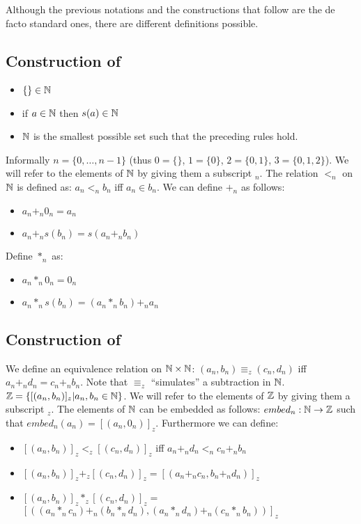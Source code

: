 Although the previous notations and the constructions that follow are
the de facto standard ones, there are different definitions possible.

\subsection{Construction of \N}

\begin{itemize}
  \item $\{\} \in \mathbb N$
  \item if $a \in \mathbb N$ then $s(a) \in \mathbb N$
  \item $\mathbb N$ is the smallest possible set such that the preceding rules
  hold.
\end{itemize}
Informally $n=\{0,\ldots,n-1\}$ (thus $0=\{\}$, $1=\{0\}$, $2=\{0,1\}$,
$3=\{0,1,2\}$). We will refer to the elements of $\mathbb N$ by giving them a
subscript $_n$. The relation $<_n$ on $\mathbb N$ is defined as: $a_n <_n b_n$
iff $a_n \in b_n$. We can define $+_n$ as follows:
\begin{itemize}
  \item $a_n +_n 0_n = a_n$
  \item $a_n +_n s(b_n) = s(a_n +_n b_n)$
\end{itemize}
Define $*_n$ as:
\begin{itemize}
  \item $a_n *_n 0_n = 0_n$
  \item $a_n *_n s(b_n) = (a_n *_n b_n) +_n a_n$
\end{itemize}

\subsection{Construction of \Z}

We define an equivalence relation on $\mathbb N \times \mathbb N$: $(a_n,b_n) \equiv_z
(c_n,d_n)$ iff $a_n +_n d_n = c_n +_n b_n$. Note that $\equiv_z$
``simulates'' a subtraction in $\mathbb N$. $\mathbb Z = \{[(a_n,b_n)]_z | a_n, b_n
\in \mathbb N\}$. We will refer to the elements of $\mathbb Z$ by giving them a
subscript $_z$.  The elements of $\mathbb N$ can be embedded as follows:
$embed_n: \mathbb N \rightarrow \mathbb Z$ such that $embed_n(a_n) =
[(a_n,0_n)]_z$. Furthermore we can define:
\begin{itemize}
  \item $[(a_n,b_n)]_z <_z [(c_n,d_n)]_z$ iff $a_n +_n d_n <_n c_n +_n b_n$
  \item $[(a_n,b_n)]_z +_z [(c_n,d_n)]_z = [(a_n +_n c_n, b_n +_n d_n)]_z$
  \item $[(a_n,b_n)]_z *_z [(c_n,d_n)]_z =$ \\
        $[\left((a_n *_n c_n) +_n (b_n *_n d_n), (a_n *_n d_n) +_n (c_n *_n
          b_n)\right)]_z$
\end{itemize}

